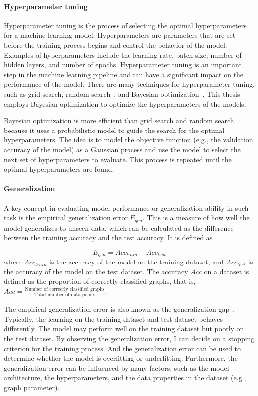 \paragraph{Hyperparameter tuning}
Hyperparameter tuning is the process of selecting the optimal hyperparameters for a machine learning model. Hyperparameters are parameters that are set before the training process begins and control the behavior of the model. Examples of hyperparameters include the learning rate, batch size, number of hidden layers, and number of epochs. Hyperparameter tuning is an important step in the machine learning pipeline and can have a significant impact on the performance of the model. There are many techniques for hyperparameter tuning, such as grid search, random search~\cite{bergstra2012random}, and Bayesian optimization~\cite{snoek2012practical}. This thesis employs Bayesian optimization to optimize the hyperparameters of the models.

Bayesian optimization is more efficient than grid search and random search because it uses a probabilistic model to guide the search for the optimal hyperparameters. The idea is to model the objective function (e.g., the validation accuracy of the model) as a Gaussian process and use the model to select the next set of hyperparameters to evaluate. This process is repeated until the optimal hyperparameters are found.

\paragraph{Generalization}
A key concept in evaluating model performance or generalization ability in such task is the empirical generalization error $E_{gen}$. This is a measure of how well the model generalizes to unseen data, which can be calculated as the difference between the training accuracy and the test accuracy. It is defined as

$$
    E_{gen} = {Acc_{train}} - {Acc_{test}}
$$
where $Acc_{train}$ is the accuracy of the model on the training dataset, and $Acc_{test}$ is the accuracy of the model on the test dataset. The accuracy $Acc$ on a dataset is defined as the proportion of correctly classified graphs, that is, $Acc = \frac{\textrm{Number of correctly classified graphs}}{\textrm{Total number of data points}}$.

The empirical generalization error is also known as the generalization gap~\cite{goodfellow2016deep}. Typically, the learning on the training dataset and test dataset behaves differently. The model may perform well on the training dataset but poorly on the test dataset. By observing the generalization error, I can decide on a stopping criterion for the training process. And the generalization error can be used to determine whether the model is overfitting or underfitting. Furthermore, the generalization error can be influenced by many factors, such as the model architecture, the hyperparameters, and the data properties in the dataset (e.g., graph parameter). 

